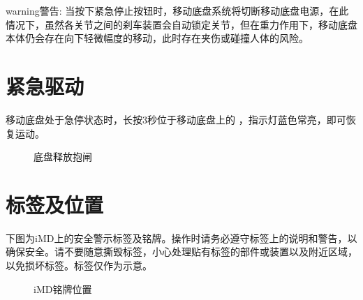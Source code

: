\documentclass[a4paper,11pt,english,openany,oneside]{sphinxmanual}
\begin{document}
\begin{sphinxadmonition}{warning}{警告:}
\sphinxAtStartPar
当按下紧急停止按钮时，移动底盘系统将切断移动底盘电源，在此情况下，虽然各关节之间的刹车装置会⾃动锁定关节，但在重力作用下，移动底盘本体仍会存在向下轻微幅度的移动，此时存在夹伤或碰撞人体的风险。
\end{sphinxadmonition}


\section{紧急驱动}
\label{\detokenize{05 _u5b89_u5168_u89c4_u8303:id12}}\label{\detokenize{05 _u5b89_u5168_u89c4_u8303:id13}}
\sphinxAtStartPar
移动底盘处于急停状态时，长按3秒位于移动底盘上的  ，指示灯蓝色常亮，即可恢复运动。

\begin{figure}[H]
\centering
\capstart

\noindent{}
\caption{底盘释放抱闸}\label{\detokenize{05 _u5b89_u5168_u89c4_u8303:id19}}\end{figure}


\section{标签及位置}
\label{\detokenize{05 _u5b89_u5168_u89c4_u8303:id14}}\label{\detokenize{05 _u5b89_u5168_u89c4_u8303:id15}}
\sphinxAtStartPar
下图为iM\sphinxhyphen{}D上的安全警示标签及铭牌。操作时请务必遵守标签上的说明和警告，以确保安全。请不要随意撕毁标签，小心处理贴有标签的部件或装置以及附近区域，以免损坏标签。标签仅作为示意。

\begin{figure}[H]
\centering
\capstart

\noindent{}
\caption{iM\sphinxhyphen{}D铭牌位置}\label{\detokenize{05 _u5b89_u5168_u89c4_u8303:id20}}\end{figure}
\end{document}
